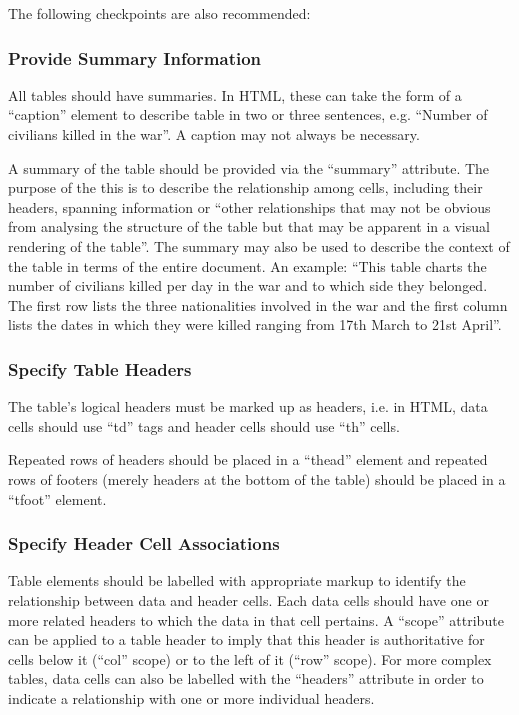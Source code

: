 The following checkpoints are also recommended:


\subsubsection{Provide Summary Information}

All tables should have summaries. In HTML, these can take the form of a
``caption'' element to describe table in two or three sentences, e.g. ``Number
of civilians killed in the war''. A caption may not always be necessary.

A summary of the table should be provided via the ``summary'' attribute. The
purpose of the this is to describe the relationship among cells, including
their headers, spanning information or ``other relationships that may not be
obvious from analysing the structure of the table but that may be apparent in a
visual rendering of the table''\cite{w3c:wcag}. The summary may also be used to
describe the context of the table in terms of the entire document. An example:
``This table charts the number of civilians killed per day in the war and to
which side they belonged. The first row lists the three nationalities involved
in the war and the first column lists the dates in which they were killed
ranging from 17th March to 21st April''.

\subsubsection{Specify Table Headers}

The table's logical headers must be marked up as headers, i.e. in HTML, data
cells should use ``td'' tags and header cells should use ``th'' cells. 

Repeated rows of headers should be placed in a ``thead'' element and repeated
rows of footers (merely headers at the bottom of the table) should be placed
in a ``tfoot'' element.

\subsubsection{Specify Header Cell Associations}

Table elements should be labelled with appropriate markup to identify the
relationship between data and header cells. Each data cells should have one or
more related headers to which the data in that cell pertains. A ``scope''
attribute can be applied to a table header to imply that this header is
authoritative for cells below it (``col'' scope) or to the left of it (``row''
scope). For more complex tables, data cells can also be labelled with the
``headers'' attribute in order to indicate a relationship with one or more
individual headers.

